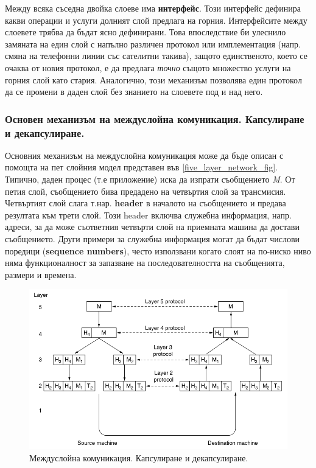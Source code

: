 \documentclass[12pt,a4paper,oneside]{book}
\begin{document}
Между всяка съседна двойка слоеве има \textbf{интерфейс}. Този интерфейс
дефинира какви операции и услуги долният слой предлага на горния. Интерфейсите
между слоевете трябва да бъдат ясно дефинирани. Това впоследствие би улеснило
замяната на един слой с напълно различен протокол или имплементация (напр.
смяна на телефонни линии със сателитни такива), защото единственото, което се
очаква от новия протокол, е да предлага \textit{точно} същото множество услуги
на горния слой като стария. Аналогично, този механизъм позволява един протокол
да се промени в даден слой без знанието на слоевете под и над него.

\subsubsection{Основен механизъм на междуслойна комуникация. Капсулиране и
декапсулиране.}

Основния механизъм на междуслойна комуникация може да бъде описан с помощта на
пет слойния модел представен във \autoref{five_layer_network_fig}. Типично,
даден процес (т.е приложение) иска да изпрати съобщението \textit{M}. От петия
слой, съобщението бива предадено на четвъртия слой за трансмисия. Четвъртият
слой слага т.нар. \textbf{header} в началото на съобщението и предава резултата
към трети слой. Този header включва служебна информация, напр. адреси, за да
може съответния четвърти слой на приемната машина да достави съобщението. Други
примери за служебна информация могат да бъдат числови поредици (\textbf{sequence
numbers}), често използвани когато слоят на по-ниско ниво няма функционалност за
запазване на последователността на съобщенията, размери и времена.

\begin{figure}[h!]
  \centering
  \includegraphics[width=1.0\textwidth]{figures/interlayer_communication.png}
  \caption{Междуслойна комуникация. Капсулиране и декапсулиране.}
  \label{interlayer_communication_fig}
\end{figure}
\end{document}
